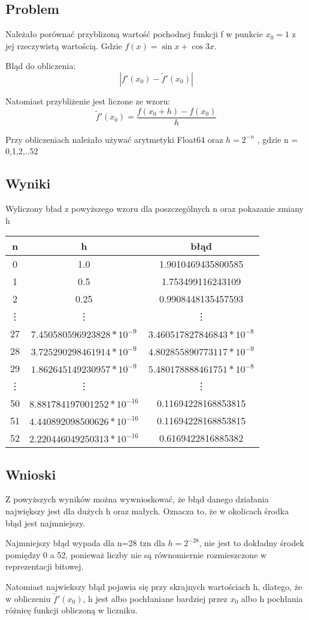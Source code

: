 \documentclass[12pt, a4paper]{article}
\begin{document}
\subsection{Problem}
Należało porównać przyblizoną wartość pochodnej funkcji f  w punkcie $x_{0} = 1$ z jej rzeczywistą wartością. Gdzie $f(x) = \sin{x} + \cos{3x}$.

 Błąd do obliczenia:
\[|f'(x_{0}) - \widetilde{f}'(x_{0})|\]

Natomiast przybliżenie jest liczone ze wzoru:
\[\widetilde{f}'(x_{0}) = \frac{f(x_{0} + h) - f(x_{0})}{h}\]

Przy obliczeniach należało używać arytmetyki Float64 oraz $h = 2^{-n}$ , gdzie n = 0,1,2,..52
\subsection{Wyniki}
Wyliczony bład z powyższego wzoru dla poszczególnych n oraz pokazanie zmiany h
\begin{center}
  \begin{tabular}{c|c|c}
    n & h & błąd  \\
    \hline
    0 & 1.0 & 1.9010469435800585\\
    1 & 0.5 & 1.753499116243109\\
    2 & 0.25 & 0.9908448135457593\\
    \vdots \qquad & \vdots \qquad & \vdots \qquad \\
    27 & $7.450580596923828 * 10^{-9}$ & $3.460517827846843 * 10^{-8}$\\
    28 & $3.725290298461914 * 10^{-9}$ & $4.802855890773117 * 10^{-9}$\\
    29 & $1.862645149230957 * 10^{-9}$ & $5.480178888461751 * 10^{-8}$\\
    \vdots \qquad & \vdots \qquad & \vdots \qquad \\
    50 & $8.881784197001252 * 10^{-16}$ & 0.11694228168853815\\
    51 & $4.440892098500626 * 10^{-16}$ & 0.11694228168853815\\
    52 & $2.220446049250313 * 10^{-16}$ & 0.6169422816885382
  \end{tabular}
\end{center}
\subsection{Wnioski}
Z powyższych wyników można wywnioskować, że błąd danego działania największy jest dla dużych h oraz małych. Oznacza to, że w okolicach środka błąd jest najmniejszy.

Najmniejszy błąd wypada dla n=28 tzn dla $h=2^{-28}$, nie jest to dokładny środek pomiędzy 0 a 52, ponieważ liczby nie są równomiernie rozmieszczone w reprezentacji bitowej.

Natomiast najwiekszy błąd pojawia się przy skrajnych wartościach h, dlatego, że w obliczeniu $\widetilde{f}'(x_{0})$, h jest albo pochłaniane bardziej przez $x_{0}$ albo h pochłania różnicę funkcji obliczoną w liczniku.
\end{document}
